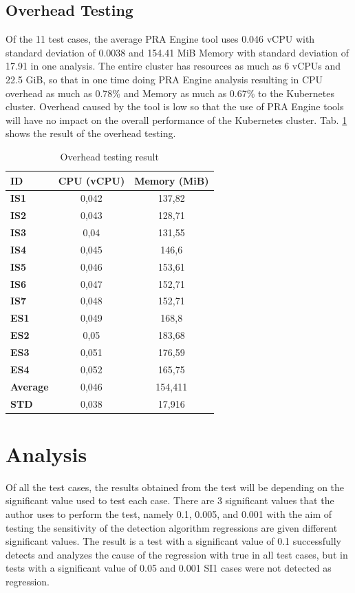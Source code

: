 \documentclass[conference]{configs/IEEEtran}
\begin{document}
\subsection{Overhead Testing}
Of the 11 test cases, the average PRA Engine tool uses 0.046
vCPU with standard deviation of 0.0038 and 154.41 MiB Memory with standard
deviation of 17.91 in one analysis. The entire cluster has resources
as much as 6 vCPUs and 22.5 GiB, so that in one time doing PRA Engine analysis
resulting in CPU overhead as much as 0.78\% and Memory as much as 0.67\% to the Kubernetes cluster. Overhead caused by the tool is low so that the use of PRA Engine tools will have no impact on the overall performance of the Kubernetes cluster. Tab. \ref{overhead-tbl} shows the result of the overhead testing.
\begin{table}[!htb]
	\caption{Overhead testing result}
	\label{overhead-tbl}
	\centering
	\begin{tabular}{|l|c|c|}
		\hline
		\multicolumn{1}{|l|}{ID} & \multicolumn{1}{l|}{CPU (vCPU)} & \multicolumn{1}{l|}{Memory (MiB)} \\ \hline
		\textbf{IS1}     & 0,042 & 137,82  \\ \hline
		\textbf{IS2}     & 0,043 & 128,71  \\ \hline
		\textbf{IS3}     & 0,04  & 131,55  \\ \hline
		\textbf{IS4}     & 0,045 & 146,6   \\ \hline
		\textbf{IS5}     & 0,046 & 153,61  \\ \hline
		\textbf{IS6}     & 0,047 & 152,71  \\ \hline
		\textbf{IS7}     & 0,048 & 152,71  \\ \hline
		\textbf{ES1}     & 0,049 & 168,8   \\ \hline
		\textbf{ES2}     & 0,05  & 183,68  \\ \hline
		\textbf{ES3}     & 0,051 & 176,59  \\ \hline
		\textbf{ES4}     & 0,052 & 165,75  \\ \hline
		\textbf{Average} & 0,046 & 154,411 \\ \hline
		\textbf{STD}     & 0,038 & 17,916  \\ \hline
	\end{tabular}
\end{table}

\section{Analysis}
Of all the test cases, the results obtained from the test will be
depending on the significant value used to test each case.
There are 3 significant values that the author uses to perform the test, namely 0.1, 0.005, and 0.001 with the aim of testing the sensitivity of the detection algorithm regressions are given different significant values. The result is a test with
a significant value of 0.1 successfully detects and analyzes the cause of the regression with true in all test cases, but in tests with a significant value of 0.05 and 0.001 SI1 cases were not detected as regression.
\end{document}
